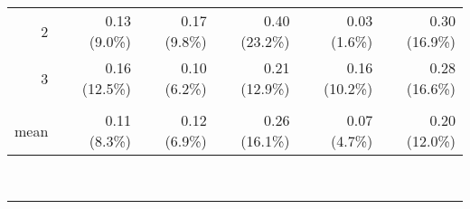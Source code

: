 \begin{table}[p]
\begin{tableframe}
\begin{adjustbox}{width={0.75\textwidth},keepaspectratio}
\begin{minipage}{\linewidth}
{\begin{minipage}{\linewidth}
\begin{tabular}{rrrrrr}
		            2     & 0.13 (9.0\%) & 0.17 (9.8\%) & 0.40 (23.2\%) & 0.03 (1.6\%) & 0.30 (16.9\%) \\
		            3     & 0.16 (12.5\%) & 0.10 (6.2\%) & 0.21 (12.9\%) & 0.16 (10.2\%) & 0.28 (16.6\%) \\
		                  &       &       &       &       &  \\
		            mean  & 0.11 (8.3\%) & 0.12 (6.9\%) & 0.26 (16.1\%) & 0.07 (4.7\%) & 0.20 (12.0\%) \\
		            \bottomrule
		\end{tabular}%
		\end{minipage}
		\label{tab:chap5exp1 scan rescan adc}
		}
\end{minipage}
\end{adjustbox}\\	
\textcolor{white}{\rule{0.95\textwidth}{1pt}}\\[0.5ex]
\begin{adjustbox}{width={0.75\textwidth},keepaspectratio}
\begin{minipage}{\linewidth}
\end{minipage}
\end{adjustbox}
\end{tableframe}
\end{table}
